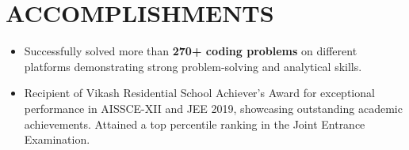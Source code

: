 \documentclass[letterpaper,11pt]{article}
\newcommand{\resumeItem}[1]{
  \item\small{
    {#1 \vspace{-2pt}}
  }
}
\newcommand{\resumeSubHeadingListEnd}{\end{itemize}}
\newcommand{\resumeItemListStart}{\begin{itemize}}
\newcommand{\resumeItemListEnd}{\end{itemize}\vspace{-5pt}}
\newcommand\sbullet[1][.5]{\mathbin{\vcenter{\hbox{\scalebox{#1}{$\bullet$}}}}}
\begin{document}



\vspace{10pt}
\section{\textbf{ACCOMPLISHMENTS } }
\vspace{-5pt}
            \resumeItemListStart
                \resumeItem{\normalsize{Successfully solved more than \textbf{270+ coding problems} on different platforms demonstrating strong problem-solving and analytical skills.}}
 \vspace{-2pt}
               \resumeItem{\normalsize{Recipient of Vikash Residential School Achiever's Award for exceptional performance in AISSCE-XII and JEE 2019, showcasing outstanding academic achievements. Attained a top percentile ranking in the Joint Entrance Examination.}}

 \vspace{-2pt}
            \resumeItemListEnd
 \vspace{-10pt}






\end{document}
